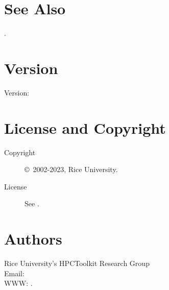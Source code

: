 \documentclass[english]{article}
\begin{document}
\section{See Also}

.

\section{Version}

Version: \Version

\section{License and Copyright}

\begin{description}
\item[Copyright] \copyright\ 2002-2023, Rice University.
\item[License] See .
\end{description}

\section{Authors}

\noindent
Rice University's HPCToolkit Research Group \\
Email:  \\
WWW: .

\LatexManEnd
\end{document}
